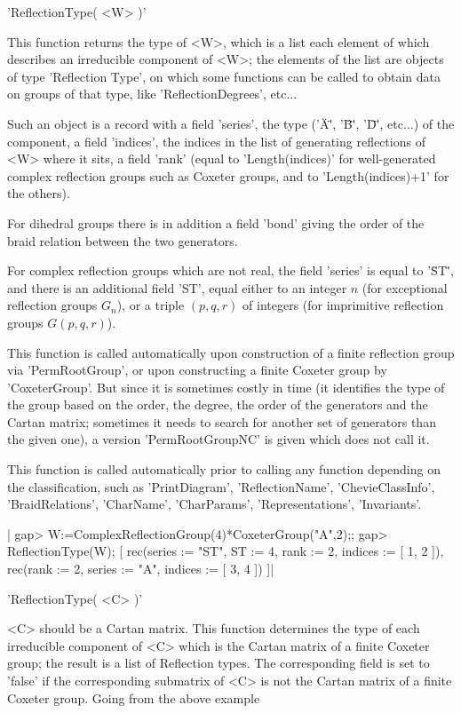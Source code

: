 'ReflectionType( <W> )'

This function returns the type of <W>, which is a list each element of which
describes an irreducible  component of <W>; the  elements of the list  are
objects of type 'Reflection Type', on which some functions can be called
to obtain data on groups of that type, like 'ReflectionDegrees', etc...

Such  an  object  is  a  record  with  a field 'series', the type ('\"A\"',
'\"B\"',  '\"D\"', etc$\ldots$)  of the  component, a  field 'indices', the
indices in the list of generating reflections of <W> where it sits, a field
'rank'  (equal to  'Length(indices)' for  well-generated complex reflection
groups such as Coxeter groups, and to 'Length(indices)+1' for the others).

For dihedral groups there is in addition a field 'bond' giving the order of
the braid relation between the two generators.

For  complex reflection  groups which  are not  real, the field 'series' is
equal  to '\"ST\"', and there is an  additional field 'ST', equal either to
an  integer  $n$  (for  exceptional  reflection  groups $G_n$), or a triple
$(p,q,r)$ of integers (for imprimitive reflection groups $G(p,q,r)$).

This  function  is  called  automatically  upon  construction  of  a finite
reflection group via 'PermRootGroup', or upon constructing a finite Coxeter
group  by  'CoxeterGroup'.  But  since  it  is sometimes costly in time (it
identifies  the type of the group based on the order, the degree, the order
of  the generators and the Cartan matrix;  sometimes it needs to search for
another  set of generators than the given one), a version 'PermRootGroupNC'
is given which does not call it.

This  function  is  called  automatically  prior  to  calling  any function
depending  on the classification, such as 'PrintDiagram', 'ReflectionName',
'ChevieClassInfo',      'BraidRelations',     'CharName',     'CharParams',
'Representations', 'Invariants'.

|    gap> W:=ComplexReflectionGroup(4)*CoxeterGroup("A",2);;
    gap> ReflectionType(W);
    [ rec(series  := "ST",
          ST      := 4,
          rank    := 2,
          indices := [ 1, 2 ]), rec(rank    := 2,
          series  := "A",
          indices := [ 3, 4 ]) ]|

'ReflectionType( <C> )'

<C>  should be a Cartan  matrix. This function determines  the type of each
irreducible component of <C> which is the Cartan matrix of a finite Coxeter
group; the result is a list of Reflection types. The corresponding field is
set  to 'false'  if the  corresponding submatrix  of <C>  is not the Cartan
matrix of a finite Coxeter group. Going from the above example\:

